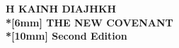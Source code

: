 \documentclass{book}
\begin{document}
\begin{center}
\vspace*{30mm}
\huge\bfseries
\textgreek{H KAINH DIAJHKH}\\*[6mm]
\LARGE
THE NEW COVENANT\\*[10mm]
\large
Second Edition\\
\vfill
\null
\end{center}
\end{document}
